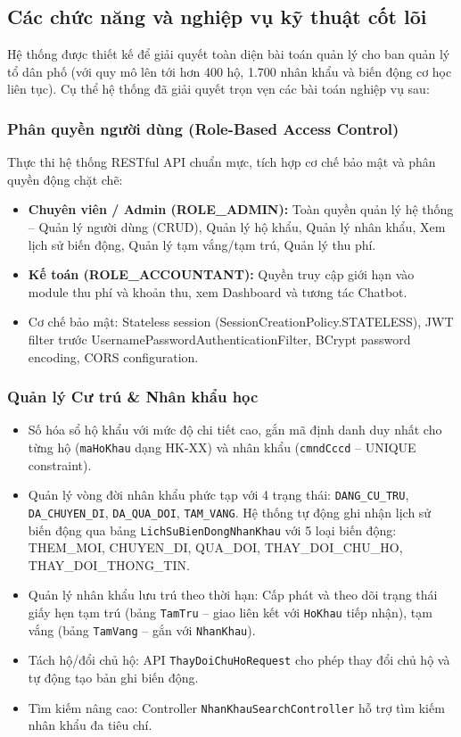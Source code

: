 \documentclass[12pt,a4paper]{article}
\begin{document}
\subsection{Các chức năng và nghiệp vụ kỹ thuật cốt lõi}
Hệ thống được thiết kế để giải quyết toàn diện bài toán quản lý cho ban quản lý tổ dân phố (với quy mô lên tới hơn 400 hộ, 1.700 nhân khẩu và biến động cơ học liên tục). Cụ thể hệ thống đã giải quyết trọn vẹn các bài toán nghiệp vụ sau:

\subsubsection{Phân quyền người dùng (Role-Based Access Control)}
Thực thi hệ thống RESTful API chuẩn mực, tích hợp cơ chế bảo mật và phân quyền động chặt chẽ:
\begin{itemize}
    \item \textbf{Chuyên viên / Admin (ROLE\_ADMIN):} Toàn quyền quản lý hệ thống -- Quản lý người dùng (CRUD), Quản lý hộ khẩu, Quản lý nhân khẩu, Xem lịch sử biến động, Quản lý tạm vắng/tạm trú, Quản lý thu phí.
    \item \textbf{Kế toán (ROLE\_ACCOUNTANT):} Quyền truy cập giới hạn vào module thu phí và khoản thu, xem Dashboard và tương tác Chatbot.
    \item Cơ chế bảo mật: Stateless session (SessionCreationPolicy.STATELESS), JWT filter trước UsernamePasswordAuthenticationFilter, BCrypt password encoding, CORS configuration.
\end{itemize}

\subsubsection{Quản lý Cư trú \& Nhân khẩu học}
\begin{itemize}
    \item Số hóa sổ hộ khẩu với mức độ chi tiết cao, gắn mã định danh duy nhất cho từng hộ (\texttt{maHoKhau} dạng HK-XX) và nhân khẩu (\texttt{cmndCccd} -- UNIQUE constraint).
    \item Quản lý vòng đời nhân khẩu phức tạp với 4 trạng thái: \texttt{DANG\_CU\_TRU}, \texttt{DA\_CHUYEN\_DI}, \texttt{DA\_QUA\_DOI}, \texttt{TAM\_VANG}. Hệ thống tự động ghi nhận lịch sử biến động qua bảng \texttt{LichSuBienDongNhanKhau} với 5 loại biến động: THEM\_MOI, CHUYEN\_DI, QUA\_DOI, THAY\_DOI\_CHU\_HO, THAY\_DOI\_THONG\_TIN.
    \item Quản lý nhân khẩu lưu trú theo thời hạn: Cấp phát và theo dõi trạng thái giấy hẹn tạm trú (bảng \texttt{TamTru} -- giao liên kết với \texttt{HoKhau} tiếp nhận), tạm vắng (bảng \texttt{TamVang} -- gắn với \texttt{NhanKhau}).
    \item Tách hộ/đổi chủ hộ: API \texttt{ThayDoiChuHoRequest} cho phép thay đổi chủ hộ và tự động tạo bản ghi biến động.
    \item Tìm kiếm nâng cao: Controller \texttt{NhanKhauSearchController} hỗ trợ tìm kiếm nhân khẩu đa tiêu chí.
\end{itemize}
\end{document}
